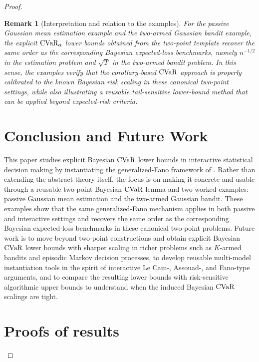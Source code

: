 \documentclass[conference]{IEEEtran}
\newtheorem{remark}{Remark}
\begin{document}
\begin{proof}[Proof]
\begin{remark}[Interpretation and relation to the examples]
For the passive Gaussian mean estimation example and the two-armed Gaussian bandit example, the explicit \(\textup{CVaR}_\alpha\) lower bounds obtained from the two-point template recover the same order as the corresponding Bayesian expected-loss benchmarks, namely \(n^{-1/2}\) in the estimation problem and \(\sqrt{T}\) in the two-armed bandit problem. In this sense, the examples verify that the corollary-based \(\textup{CVaR}\) approach is properly calibrated to the known Bayesian risk scaling in these canonical two-point settings, while also illustrating a reusable tail-sensitive lower-bound method that can be applied beyond expected-risk criteria.
\end{remark}
\section{Conclusion and Future Work}
This paper studies explicit Bayesian \(\textup{CVaR}\) lower bounds in interactive statistical decision making by instantiating the generalized-Fano framework of \cite{bongole2026generalizing}. Rather than extending the abstract theory itself, the focus is on making it concrete and usable through a reusable two-point Bayesian \(\textup{CVaR}\) lemma and two worked examples: passive Gaussian mean estimation and the two-armed Gaussian bandit. These examples show that the same generalized-Fano mechanism applies in both passive and interactive settings and recovers the same order as the corresponding Bayesian expected-loss benchmarks in these canonical two-point problems. Future work is to move beyond two-point constructions and obtain explicit Bayesian \(\textup{CVaR}\) lower bounds with sharper scaling in richer problems such as \(K\)-armed bandits and episodic Markov decision processes, to develop reusable multi-model instantiation tools in the spirit of interactive Le Cam-, Assouad-, and Fano-type arguments, and to compare the resulting lower bounds with risk-sensitive algorithmic upper bounds to understand when the induced Bayesian \(\textup{CVaR}\) scalings are tight.
\IEEEpeerreviewmaketitle





\newpage
\appendix
\section{Proofs of results}
\label{sec:proofs-results}


\end{proof}
\end{document}
